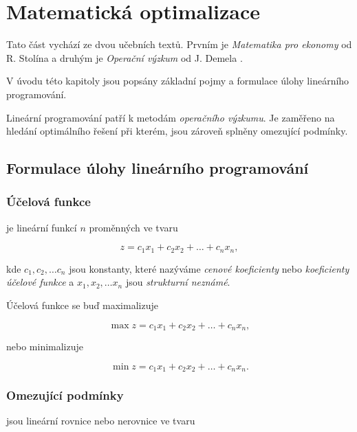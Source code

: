 \section{Matematická optimalizace}
Tato část vychází ze dvou učebních textů. Prvním je \textit{Matematika pro ekonomy} od R. Stolína \cite{matematika_pro_ekonomy} a druhým je \textit{Operační výzkum} od J. Demela \cite{demel}.


V úvodu této kapitoly jsou popsány základní pojmy a formulace úlohy lineárního programování.

Lineární programování patří k metodám \textit{operačního výzkumu}.
Je zaměřeno na hledání optimálního řešení při kterém, jsou zároveň splněny omezující podmínky.

\subsection{Formulace úlohy lineárního programování}

\subsubsection{Účelová funkce}

je lineární funkcí $n$ proměnných ve tvaru

\begin{equation}
    z = c_1x_1 + c_2x_2 + \ldots + c_nx_n ,
\end{equation}


kde $c_1, c_2, \ldots c_n$ jsou konstanty, které nazýváme \textit{cenové koeficienty} nebo \textit{koeficienty účelové funkce} a 
$x_1, x_2, \ldots x_n$ jsou \textit{strukturní neznámé}.

Účelová funkce se buď maximalizuje

\begin{equation}
    \max z = c_1x_1 + c_2x_2 + \ldots + c_nx_n ,
\end{equation}

nebo minimalizuje

\begin{equation}
    \min z = c_1x_1 + c_2x_2 + \ldots + c_nx_n .
\end{equation}

\subsubsection{Omezující podmínky}

jsou lineární rovnice nebo nerovnice ve tvaru


